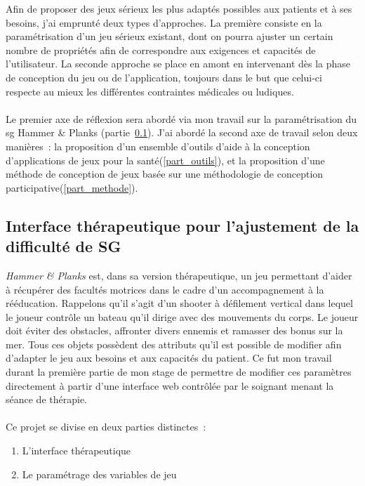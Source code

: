 Afin de proposer des jeux sérieux les plus adaptés possibles aux patients et à ses besoins, j'ai emprunté deux types d'approches. La première consiste en la paramétrisation d'un jeu sérieux existant, dont on pourra ajuster un certain nombre de propriétés afin de correspondre aux exigences et capacités de l'utilisateur. La seconde approche se place en amont en intervenant dès la phase de conception du jeu ou de l'application, toujours dans le but que celui-ci respecte au mieux les différentes contraintes médicales ou ludiques.

\paragraph{}
Le premier axe de réflexion sera abordé via mon travail sur la paramétrisation du \gls{sg} Hammer \& Planks (partie~\ref{part_interface}). J'ai abordé la second axe de travail selon deux manières~: la proposition d'un ensemble d'outils d'aide à la conception d'applications de jeux pour la santé(\ref{part_outils}), et la proposition d'une méthode de conception de jeux basée sur une méthodologie de conception participative(\ref{part_methode}).

\subsection{Interface thérapeutique pour l'ajustement de la difficulté de SG}	\label{part_interface}
\emph{Hammer \& Planks} est, dans sa version thérapeutique, un jeu permettant d'aider à récupérer des facultés motrices dans le cadre d'un accompagnement à la rééducation. Rappelons qu'il s'agit d'un shooter à défilement vertical dans lequel le joueur contrôle un bateau qu'il dirige avec des mouvements du corps. Le joueur doit éviter des obstacles, affronter divers ennemis et ramasser des bonus sur la mer. Tous ces objets possèdent des attributs qu'il est possible de modifier afin d'adapter le jeu aux besoins et aux capacités du patient. Ce fut mon travail durant la première partie de mon stage de permettre de modifier ces paramètres directement à partir d'une interface web contrôlée par le soignant menant la séance de thérapie.
\paragraph{}
Ce projet se divise en deux parties distinctes~:
\begin{enumerate}
	\item L'interface thérapeutique
	\item Le paramétrage des variables de jeu
\end{enumerate}

